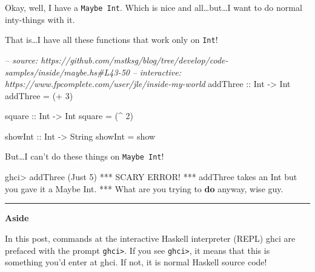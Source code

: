 \documentclass[]{article}
\newenvironment{Shaded}{}{}
\newcommand{\KeywordTok}[1]{\textcolor[rgb]{0.00,0.44,0.13}{\textbf{{#1}}}}
\newcommand{\DataTypeTok}[1]{\textcolor[rgb]{0.56,0.13,0.00}{{#1}}}
\newcommand{\DecValTok}[1]{\textcolor[rgb]{0.25,0.63,0.44}{{#1}}}
\newcommand{\CommentTok}[1]{\textcolor[rgb]{0.38,0.63,0.69}{\textit{{#1}}}}
\newcommand{\OtherTok}[1]{\textcolor[rgb]{0.00,0.44,0.13}{{#1}}}
\newcommand{\FunctionTok}[1]{\textcolor[rgb]{0.02,0.16,0.49}{{#1}}}
\newcommand{\NormalTok}[1]{{#1}}
\begin{document}
Okay, well, I have a \texttt{Maybe\ Int}. Which is nice and all\ldots{}but\ldots{}I want to do
normal inty-things with it.

That is\ldots{}I have all these functions that work only on \texttt{Int}!

\begin{Shaded}
\begin{Highlighting}[]
\CommentTok{-- source: https://github.com/mstksg/blog/tree/develop/code-samples/inside/maybe.hs#L43-50}
\CommentTok{-- interactive: https://www.fpcomplete.com/user/jle/inside-my-world}
\OtherTok{addThree ::} \DataTypeTok{Int} \OtherTok{->} \DataTypeTok{Int}
\NormalTok{addThree }\FunctionTok{=} \NormalTok{(}\FunctionTok{+} \DecValTok{3}\NormalTok{)}

\OtherTok{square ::} \DataTypeTok{Int} \OtherTok{->} \DataTypeTok{Int}
\NormalTok{square }\FunctionTok{=} \NormalTok{(}\FunctionTok{^} \DecValTok{2}\NormalTok{)}

\NormalTok{showInt}\OtherTok{ ::} \DataTypeTok{Int} \OtherTok{->} \DataTypeTok{String}
\NormalTok{showInt }\FunctionTok{=} \NormalTok{show}
\end{Highlighting}
\end{Shaded}

But\ldots{}I can't do these things on \texttt{Maybe\ Int}!

\begin{Shaded}
\begin{Highlighting}[]
\NormalTok{ghci}\FunctionTok{>} \NormalTok{addThree (}\DataTypeTok{Just} \DecValTok{5}\NormalTok{)}
\FunctionTok{***} \DataTypeTok{SCARY} \DataTypeTok{ERROR}\FunctionTok{!}
\FunctionTok{***} \NormalTok{addThree takes an }\DataTypeTok{Int} \NormalTok{but you gave it a }\DataTypeTok{Maybe} \DataTypeTok{Int}\FunctionTok{.}
\FunctionTok{***} \DataTypeTok{What} \NormalTok{are you trying to }\KeywordTok{do} \NormalTok{anyway, wise guy}\FunctionTok{.}
\end{Highlighting}
\end{Shaded}

\begin{center}\rule{0.5\linewidth}{\linethickness}\end{center}

\textbf{Aside}

In this post, commands at the interactive Haskell interpreter (REPL) ghci are prefaced with the
prompt \texttt{ghci\textgreater{}}. If you see \texttt{ghci\textgreater{}}, it means that this is
something you'd enter at ghci. If not, it is normal Haskell source code!
\end{document}

